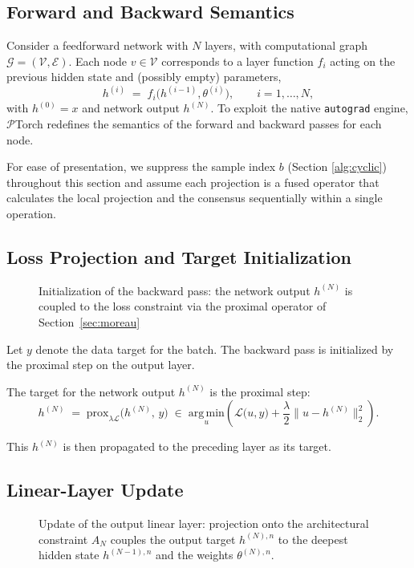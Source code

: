 \documentclass{article}
\begin{document}
\subsection{Forward and Backward Semantics}
Consider a feedforward network with $N$ layers, with computational graph $\mathcal{G} = (\mathcal{V}, \mathcal{E})$. Each node $v \in \mathcal{V}$ corresponds to a layer function $f_i$ acting on the previous hidden state and (possibly empty) parameters,
\begin{equation}
h^{(i)} \;=\; f_i\bigl(h^{(i-1)}, \theta^{(i)}\bigr), \qquad i = 1, \dots, N,
\end{equation}
with $h^{(0)} = x$ and network output $h^{(N)}$. To exploit the native \texttt{autograd} engine, $\mathcal{P}$Torch redefines the semantics of the forward and backward passes for each node.

For ease of presentation, we suppress the sample index $b$ (Section \ref{alg:cyclic}) throughout this section and assume each projection is a fused operator that calculates the local projection and the consensus sequentially within a single operation.

\subsection{Loss Projection and Target Initialization}
 
\begin{figure}[htbp]
\centering
\resizebox{\textwidth}{!}{%

}
\caption{Initialization of the backward pass: the network output $h^{(N)}$ is coupled to
the loss constraint via the proximal operator of Section~\ref{sec:moreau}}
\end{figure}

Let $y$ denote the data target for the batch. The backward pass is initialized by the proximal step on the output layer.

The target for the network output $h^{(N)}$ is the proximal step:
\begin{equation}
\label{eq:proximal-step}
h^{(N)} \;=\; \mathrm{prox}_{\lambda \mathcal{L}}\!\bigl(h^{(N)},\, y\bigr) \;\in\; \underset{u}{\mathrm{arg\,min}} \left( \mathcal{L}\bigl(u, y\bigr) + \frac{\lambda}{2} \bigl\|u - h^{(N)}\bigr\|_2^2 \right).
\end{equation}

This $h^{(N)}$ is then propagated to the preceding layer as its target.

 
\subsection{Linear-Layer Update}
\begin{figure}[htbp]
\centering
\resizebox{\textwidth}{!}{%

}
\caption{Update of the output linear layer: projection onto the architectural constraint
$A_{N}$ couples the output target ${h}^{(N),n}$ to the deepest hidden state
$h^{(N-1),n}$ and the weights $\theta^{(N),n}$.}
\label{fig:next_back_prop}
\end{figure}
\end{document}
